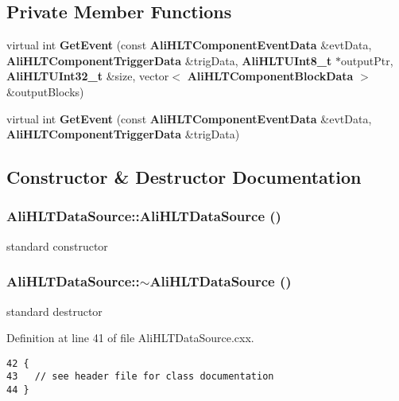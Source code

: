 \subsection*{Private Member Functions}
\begin{CompactItemize}
\item 
virtual int {\bf Get\-Event} (const {\bf Ali\-HLTComponent\-Event\-Data} \&evt\-Data, {\bf Ali\-HLTComponent\-Trigger\-Data} \&trig\-Data, {\bf Ali\-HLTUInt8\_\-t} $\ast$output\-Ptr, {\bf Ali\-HLTUInt32\_\-t} \&size, vector$<$ {\bf Ali\-HLTComponent\-Block\-Data} $>$ \&output\-Blocks)
\item 
virtual int {\bf Get\-Event} (const {\bf Ali\-HLTComponent\-Event\-Data} \&evt\-Data, {\bf Ali\-HLTComponent\-Trigger\-Data} \&trig\-Data)
\end{CompactItemize}


\subsection{Constructor \& Destructor Documentation}
\subsubsection{\setlength{\rightskip}{0pt plus 5cm}Ali\-HLTData\-Source::Ali\-HLTData\-Source ()}\label{classAliHLTDataSource_a0}


standard constructor 
\subsubsection{\setlength{\rightskip}{0pt plus 5cm}Ali\-HLTData\-Source::$\sim${\bf Ali\-HLTData\-Source} ()\hspace{0.3cm}{\tt  [virtual]}}\label{classAliHLTDataSource_a1}


standard destructor 

Definition at line 41 of file Ali\-HLTData\-Source.cxx.

\footnotesize\begin{verbatim}42 { 
43   // see header file for class documentation
44 }
\end{verbatim}\normalsize 




